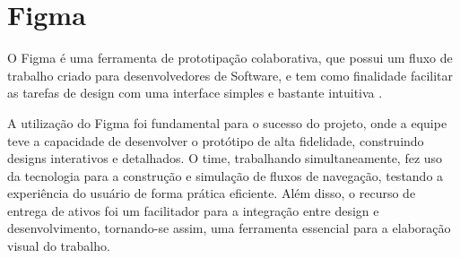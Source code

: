 \section{Figma}
O Figma é uma ferramenta de prototipação colaborativa, que possui um fluxo de trabalho criado para desenvolvedores de Software, e tem como finalidade facilitar as tarefas de design com uma interface simples e bastante intuitiva \cite{figma2025}.

A utilização do Figma foi fundamental para o sucesso do projeto, onde a equipe teve a capacidade de desenvolver o protótipo de alta fidelidade, construindo designs interativos e detalhados. O time, trabalhando simultaneamente, fez uso da tecnologia para a construção e simulação de fluxos de navegação, testando a experiência do usuário de forma prática eficiente. Além disso, o recurso de entrega de ativos foi um facilitador para a integração entre design e desenvolvimento, tornando-se assim, uma ferramenta essencial para a elaboração visual do trabalho.
